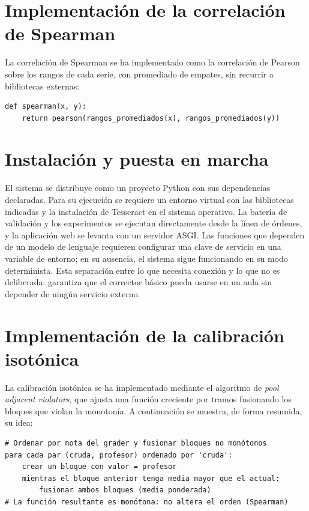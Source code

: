 \section{Implementación de la correlación de Spearman}

La correlación de Spearman se ha implementado como la correlación de Pearson sobre los rangos de cada serie, con promediado de empates, sin recurrir a bibliotecas externas:

\begin{lstlisting}[style=pycode]
def spearman(x, y):
    return pearson(rangos_promediados(x), rangos_promediados(y))
\end{lstlisting}

\section{Instalación y puesta en marcha}

El sistema se distribuye como un proyecto Python con sus dependencias declaradas. Para su ejecución se requiere un entorno virtual con las bibliotecas indicadas y la instalación de Tesseract en el sistema operativo. La batería de validación y los experimentos se ejecutan directamente desde la línea de órdenes, y la aplicación web se levanta con un servidor ASGI. Las funciones que dependen de un modelo de lenguaje requieren configurar una clave de servicio en una variable de entorno; en su ausencia, el sistema sigue funcionando en su modo determinista. Esta separación entre lo que necesita conexión y lo que no es deliberada: garantiza que el corrector básico pueda usarse en un aula sin depender de ningún servicio externo.

\section{Implementación de la calibración isotónica}

La calibración isotónica se ha implementado mediante el algoritmo de \emph{pool adjacent violators}, que ajusta una función creciente por tramos fusionando los bloques que violan la monotonía. A continuación se muestra, de forma resumida, su idea:

\begin{lstlisting}[style=pycode]
# Ordenar por nota del grader y fusionar bloques no monótonos
para cada par (cruda, profesor) ordenado por 'cruda':
    crear un bloque con valor = profesor
    mientras el bloque anterior tenga media mayor que el actual:
        fusionar ambos bloques (media ponderada)
# La función resultante es monótona: no altera el orden (Spearman)
\end{lstlisting}

